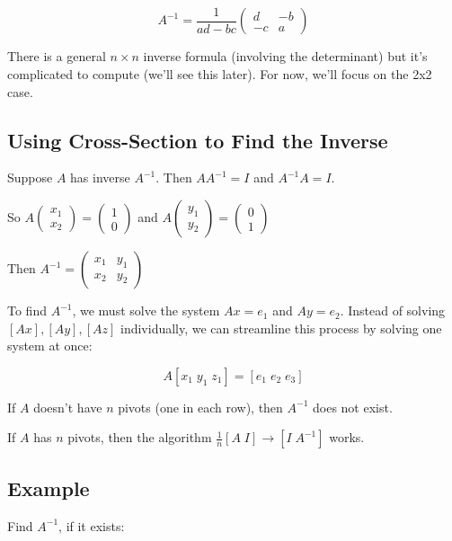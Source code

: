 \documentclass[12pt,a4paper]{article}
\begin{document}
\[A^{-1} = \frac{1}{ad-bc} \begin{pmatrix} d & -b \\ -c & a \end{pmatrix}\]

There is a general $n \times n$ inverse formula (involving the determinant) but it's complicated to compute (we'll see this later). For now, we'll focus on the 2x2 case.

\subsection{Using Cross-Section to Find the Inverse}

Suppose $A$ has inverse $A^{-1}$. Then $AA^{-1} = I$ and $A^{-1}A = I$.

So $A\begin{pmatrix} x_1 \\ x_2 \end{pmatrix} = \begin{pmatrix} 1 \\ 0 \end{pmatrix}$ and $A\begin{pmatrix} y_1 \\ y_2 \end{pmatrix} = \begin{pmatrix} 0 \\ 1 \end{pmatrix}$

Then $A^{-1} = \begin{pmatrix} x_1 & y_1 \\ x_2 & y_2 \end{pmatrix}$

To find $A^{-1}$, we must solve the system $Ax = e_1$ and $Ay = e_2$. Instead of solving $[Ax], [Ay], [Az]$ individually, we can streamline this process by solving one system at once:

\[A[x_1 \; y_1 \; z_1] = [e_1 \; e_2 \; e_3]\]

If $A$ doesn't have $n$ pivots (one in each row), then $A^{-1}$ does not exist.

If $A$ has $n$ pivots, then the algorithm $\frac{1}{n}[A \; I] \rightarrow [I \; A^{-1}]$ works.

\subsection{Example}

Find $A^{-1}$, if it exists:
\end{document}
